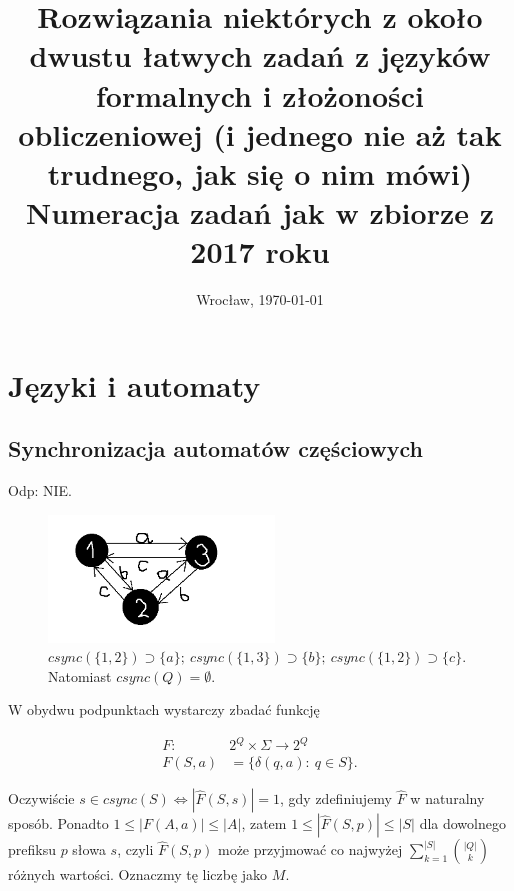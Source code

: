\documentclass[a4paper,11pt]{article}
\date{Wrocław, \today}
\title{\LARGE{\textbf{Rozwiązania niektórych z około dwustu łatwych zadań z języków formalnych i złożoności obliczeniowej 
(i jednego nie aż tak trudnego, jak się o nim mówi)}\\\Large{Numeracja zadań jak w zbiorze z 2017 roku}}}
\author{}
\newenvironment{zadanie}[1]
  {\renewcommand\theinnercustomthm{#1}\innercustomthm}
  {\endinnercustomthm}
\begin{document}
\maketitle

\section{\LARGE{Języki i automaty}}

\subsection{\Large{Synchronizacja automatów częściowych}}

\begin{zadanie}{40}
\end{zadanie}

Odp: NIE. \\


\begin{figure}[h!]
  \centerline{%
    \includegraphics[width=6cm]{zad40.png}%
  }%
  \caption{$csync(\{1,2\}) \supset \{a\}; \ csync(\{1,3\}) \supset \{b\};\ csync(\{1,2\}) \supset \{c\}$. Natomiast $csync(Q) = \emptyset $.}
\end{figure}


\begin{zadanie}{41}
\end{zadanie}
W obydwu podpunktach wystarczy zbadać funkcję

\begin{align*}
 F :\ &2^Q \times \Sigma \longrightarrow 2^Q \\
 F(S,a) &= \{ \delta(q,a) : \ q \in S \}.
\end{align*}

Oczywiście $s \in csync(S) \Longleftrightarrow |\widehat{F}(S,s)| = 1$, gdy zdefiniujemy $\widehat{F}$ w naturalny sposób. 
Ponadto $1 \leqslant |F(A,a)| \leqslant |A|$, zatem $1 \leqslant |\widehat{F}(S,p)| \leqslant |S|$ dla dowolnego prefiksu $p$ słowa $s$,
czyli $\widehat{F}(S,p)$ może przyjmować co najwyżej $\displaystyle{\sum\limits^{|S|}_{k=1}\binom{|Q|}{k}}$ różnych wartości.
Oznaczmy tę liczbę jako $M$. \\ \\
\end{document}
